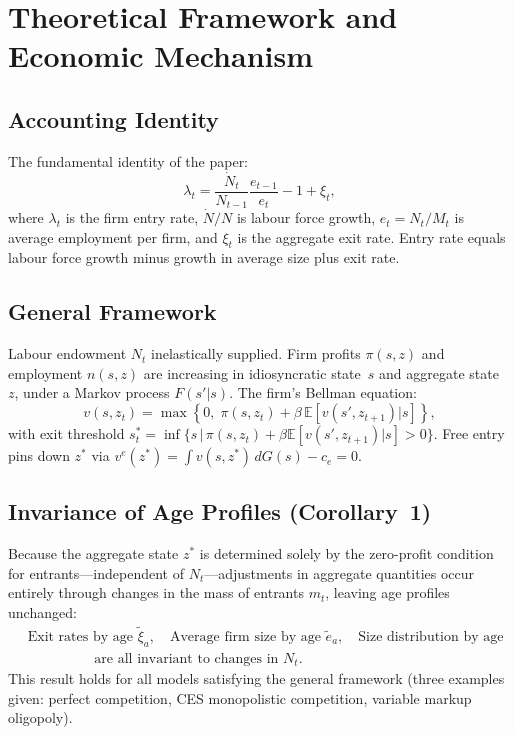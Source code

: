 \section{Theoretical Framework and Economic Mechanism}

\subsection*{Accounting Identity}

The fundamental identity of the paper:
\begin{equation}
  \lambda_t = \frac{\dot{N}_t}{N_{t-1}}\frac{e_{t-1}}{e_t} - 1 + \xi_t,
  \label{eq:hns_identity}
\end{equation}
where $\lambda_t$ is the firm entry rate, $\dot{N}/N$ is labour force growth,
$e_t = N_t/M_t$ is average employment per firm, and $\xi_t$ is the aggregate
exit rate. Entry rate equals labour force growth minus growth in average size
plus exit rate.

\subsection*{General Framework}

Labour endowment $N_t$ inelastically supplied. Firm profits
$\pi(s,z)$ and employment $n(s,z)$ are increasing in idiosyncratic state~$s$
and aggregate state~$z$, under a Markov process $F(s'|s)$. The firm's
Bellman equation:
\begin{equation}
  v(s,z_t) = \max\!\left\{0,\;\pi(s,z_t)+\beta\,\mathbb{E}[v(s',z_{t+1})|s]\right\},
  \label{eq:hns_bellman}
\end{equation}
with exit threshold $s^*_t = \inf\{s\,|\,\pi(s,z_t)+\beta\mathbb{E}[v(s',z_{t+1})|s]>0\}$.
Free entry pins down $z^*$ via $v^e(z^*) = \int v(s,z^*)\,dG(s) - c_e = 0$.

\subsection*{Invariance of Age Profiles (Corollary~1)}

Because the aggregate state $z^*$ is determined solely by the zero-profit
condition for entrants---independent of $N_t$---adjustments in aggregate
quantities occur entirely through changes in the mass of entrants $m_t$,
leaving age profiles unchanged:
\begin{align*}
  &\text{Exit rates by age } \tilde{\xi}_a, \quad
  \text{Average firm size by age } \tilde{e}_a, \quad
  \text{Size distribution by age}\\
  &\hspace{2cm}\text{are all invariant to changes in } N_t.
\end{align*}
This result holds for all models satisfying the general framework
(three examples given: perfect competition, CES monopolistic competition,
variable markup oligopoly).

